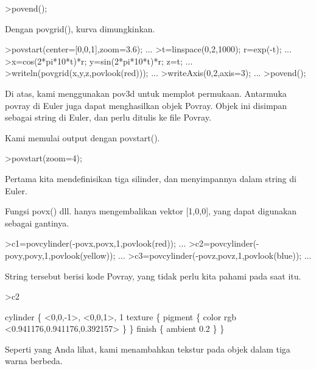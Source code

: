 \documentclass{article}
\begin{document}
\begin{eulernotebook}
\begin{eulercomment}
\begin{eulercomment}
\begin{eulercomment}
\begin{eulercomment}
\begin{eulerprompt}
>povend();
\end{eulerprompt}
\begin{eulercomment}
Dengan povgrid(), kurva dimungkinkan.
\end{eulercomment}
\begin{eulerprompt}
>povstart(center=[0,0,1],zoom=3.6); ...
>t=linspace(0,2,1000); r=exp(-t); ...
>x=cos(2*pi*10*t)*r; y=sin(2*pi*10*t)*r; z=t; ...
>writeln(povgrid(x,y,z,povlook(red))); ...
>writeAxis(0,2,axis=3); ...
>povend();
\end{eulerprompt}
\begin{eulercomment}
Di atas, kami menggunakan pov3d untuk memplot permukaan. Antarmuka
povray di Euler juga dapat menghasilkan objek Povray. Objek ini
disimpan sebagai string di Euler, dan perlu ditulis ke file Povray.

Kami memulai output dengan povstart().
\end{eulercomment}
\begin{eulerprompt}
>povstart(zoom=4);
\end{eulerprompt}
\begin{eulercomment}
Pertama kita mendefinisikan tiga silinder, dan menyimpannya dalam
string di Euler.

Fungsi povx() dll. hanya mengembalikan vektor [1,0,0], yang dapat
digunakan sebagai gantinya.
\end{eulercomment}
\begin{eulerprompt}
>c1=povcylinder(-povx,povx,1,povlook(red)); ...
>c2=povcylinder(-povy,povy,1,povlook(yellow)); ...
>c3=povcylinder(-povz,povz,1,povlook(blue)); ...
\end{eulerprompt}
\begin{eulercomment}
String tersebut berisi kode Povray, yang tidak perlu kita pahami pada
saat itu.
\end{eulercomment}
\begin{eulerprompt}
>c2
\end{eulerprompt}
\begin{euleroutput}
  cylinder \{ <0,0,-1>, <0,0,1>, 1
   texture \{ pigment \{ color rgb <0.941176,0.941176,0.392157> \}  \} 
   finish \{ ambient 0.2 \} 
   \}
\end{euleroutput}
\begin{eulercomment}
Seperti yang Anda lihat, kami menambahkan tekstur pada objek dalam
tiga warna berbeda.


\end{eulercomment}
\end{eulercomment}
\end{eulercomment}
\end{eulercomment}
\end{eulercomment}
\end{eulernotebook}
\end{document}
